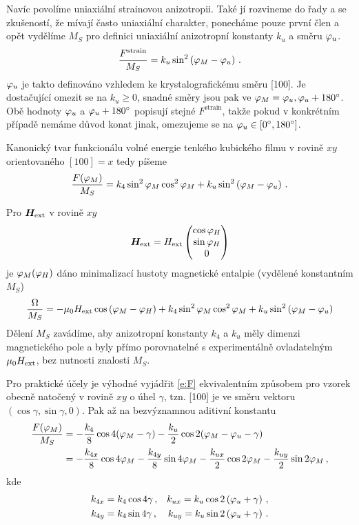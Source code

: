 Navíc povolíme uniaxiální strainovou anizotropii.
Také jí rozvineme do řady a se zkušeností, že mívají často uniaxiální charakter, ponecháme pouze první člen a opět vydělíme $M_S$ pro definici uniaxiální anizotropní konstanty $k_u$ a směru $\varphi_u$.
\begin{equation}
    \frac{F^\textrm{strain}}{M_S}=k_u \sin^2\left( \varphi_M-\varphi_u  \right) \,.
\end{equation}
$\varphi_u$ je takto definováno vzhledem ke krystalografickému směru [100].
Je dostačující omezit se na $k_u\geq 0$, snadné směry jsou pak ve $\varphi_M=\varphi_u, \varphi_u+\SI{180}{\degree}$.
Obě hodnoty $\varphi_u$ a $\varphi_u+\SI{180}{\degree}$ popisují stejné $F^\textrm{strain}$, takže pokud v konkrétním případě nemáme důvod konat jinak, omezujeme se na $\varphi_u \in [\SI{0}{\degree}, \SI{180}{\degree}]$.

Kanonický tvar funkcionálu volné energie tenkého kubického filmu v rovině $xy$ orientovaného $[100]=x$ tedy píšeme
\begin{equation}
\label{e:F}
    \frac{F(\varphi_M)}{M_S}=k_4 \sin^2 \varphi_M \cos^2 \varphi_M + k_u \sin^2\left( \varphi_M-\varphi_u  \right) \,.
\end{equation}

Pro $\bm{H}_\textrm{ext}$ v rovině $xy$
\begin{equation}
    \bm{H}_\textrm{ext} =H_\textrm{ext} \begin{pmatrix} \cos \varphi_H \\ \sin \varphi_H \\ 0 \end{pmatrix}
\end{equation}
je $\varphi_M(\varphi_H)$ dáno minimalizací hustoty magnetické entalpie (vydělené konstantním $M_S$)
\begin{equation}
\frac{\Omega}{M_S}=-\mu_0 H_\textrm{ext} \cos \left(\varphi_M-\varphi_H \right) + k_4 \sin^2 \varphi_M \cos^2 \varphi_M + k_u \sin^2\left( \varphi_M-\varphi_u  \right)
\end{equation}
Dělení $M_S$ zavádíme, aby anizotropní konstanty $k_4$ a $k_u$ měly dimenzi magnetického pole a byly přímo porovnatelné s experimentálně ovladatelným $\mu_0H_\textrm{ext}$, bez nutnosti znalosti $M_S$.

Pro praktické účely je výhodné vyjádřit \eqref{e:F} ekvivalentním způsobem pro vzorek obecně natočený v rovině $xy$ o úhel $\gamma$, tzn. [100] je ve směru vektoru $(\cos\gamma, \sin\gamma, 0)$.
Pak až na bezvýznamnou aditivní konstantu
\begin{align}
    \frac{F(\varphi_M)}{M_S}&=-\frac{k_4}{8} \cos 4(\varphi_M-\gamma)-\frac{k_u}{2} \cos 2(\varphi_M-\varphi_u-\gamma) \\
    &=-\frac{k_{4x}}{8} \cos 4\varphi_M - \frac{k_{4y}}{8} \sin 4\varphi_M - \frac{k_{ux}}{2} \cos 2 \varphi_M - \frac{k_{uy}}{2} \sin 2 \varphi_M \,,
\end{align}
kde
\begin{align}
    k_{4x}&=k_4 \cos 4\gamma \,, & k_{ux}=k_u \cos 2 \left(\varphi_u+\gamma\right) \,,\\
    k_{4y}&=k_4 \sin 4\gamma \,, & k_{uy}=k_u \sin 2 \left(\varphi_u+\gamma\right) \,.
\end{align}

